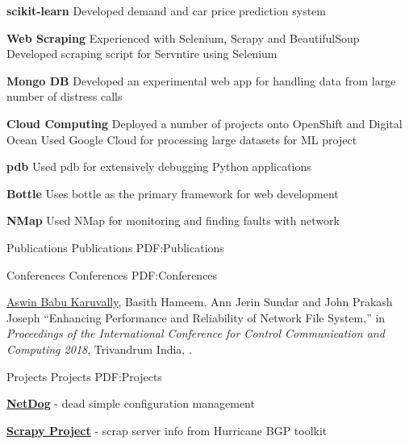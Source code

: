 \documentclass[letterpaper,MMMyyyy,nonstopmode]{simpleresumecv}
\begin{document}
\begin{Body}
\BigGap
\BulletItem
\textbf{scikit-learn}
\SubBulletItem
Developed demand and car price prediction system

\BigGap
\BulletItem
\textbf{Web Scraping}
\SubBulletItem
Experienced with Selenium, Scrapy and BeautifulSoup
\SubBulletItem
Developed scraping script for Servntire using Selenium

\BigGap
\BulletItem
\textbf{Mongo DB}
\SubBulletItem
Developed an experimental web app for handling data from large number of
distress calls

\BigGap
\BulletItem
\textbf{Cloud Computing}
\SubBulletItem
Deployed a number of projects onto OpenShift and Digital Ocean
\SubBulletItem
Used Google Cloud for processing large datasets for ML project

\BigGap
\BulletItem
\textbf{pdb}
\SubBulletItem
Used pdb for extensively debugging Python applications

\BigGap
\BulletItem
\textbf{Bottle}
\SubBulletItem
Uses bottle as the primary framework for web development

\BigGap
\BulletItem
\textbf{NMap}
\SubBulletItem
Used NMap for monitoring and finding faults with network


\pagebreak
\Section
{Publications}
{Publications}
{PDF:Publications}

\SubSection
{Conferences}
{Conferences}
{PDF:Conferences}

\begingroup
\renewcommand{\MaxNumberedItem}{[8888]}

\NumberedItem{[1]}
{\underline{Aswin Babu Karuvally}, Basith Hameem, Ann Jerin Sundar and John
Prakash Joseph ``Enhancing Performance and Reliability of Network File System,''
in \textit{Proceedings of the International Conference for Control Communication
and Computing 2018}, Trivandrum India,
.}

\endgroup


\BigGap
\Section
{Projects}
{Projects}
{PDF:Projects}

\BulletItem
\href{https://github.com/karuvally/project_green}
{\textbf{NetDog}} - dead simple configuration management
\hfill
{}

\BulletItem
\href{https://github.com/karuvally/scrapy_project}
{\textbf{Scrapy Project}} - scrap server info from Hurricane BGP toolkit
\hfill
{}


\end{Body}
\end{document}
